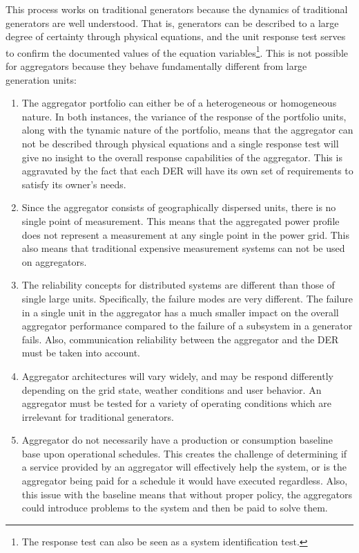 This process works on traditional generators because the dynamics of traditional generators are well understood. That is, generators can be described to a large degree of certainty through physical equations, and the unit response test serves to confirm the documented values of the equation variables\footnote{The response test can also be seen as a system identification test.}. This is not possible for aggregators because they behave fundamentally different from large generation units:
\begin{enumerate}
	\item The aggregator portfolio can either be of a heterogeneous or homogeneous nature. In both instances, the variance of the response of the portfolio units, along with the tynamic nature of the portfolio, means that the aggregator can not be described through physical equations and a single response test will give no insight to the overall response capabilities of the aggregator. This is aggravated by the fact that each DER will have its own set of requirements to satisfy its owner's needs.
	\item Since the aggregator consists of geographically dispersed units, there is no single point of measurement. This means that the aggregated power profile does not represent a measurement at any single point in the power grid. This also means that traditional expensive measurement systems can not be used on aggregators.
	\item The reliability concepts for distributed systems are different than those of single large units. Specifically, the failure modes are very different. The failure in a single unit in the aggregator has a much smaller impact on the overall aggregator performance compared to the failure of a subsystem in a generator fails. Also, communication reliability between the aggregator and the DER must be taken into account.
	\item Aggregator architectures will vary widely, and may be respond differently depending on the grid state, weather conditions and user behavior. An aggregator must be tested for a variety of operating conditions which are irrelevant for traditional generators.
	\item Aggregator do not necessarily have a production or consumption baseline base upon operational schedules. This creates the challenge of determining if a service provided by an aggregator will effectively help the system, or is the aggregator being paid for a schedule it would have executed regardless. Also, this issue with the baseline means that without proper policy, the aggregators could introduce problems to the system and then be paid to solve them.%

\end{enumerate}
